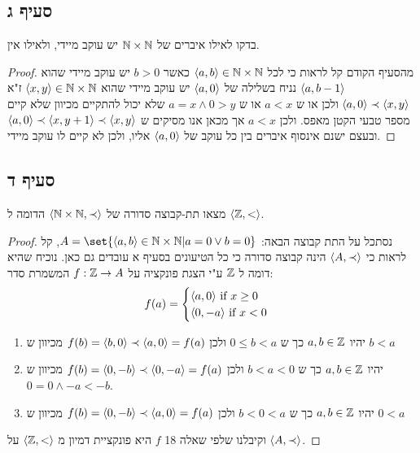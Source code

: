 \documentclass{article}
\DeclarePairedDelimiter\set\{\}
\begin{document}
	\subsection*{סעיף ג}
	בדקו לאילו איברים של $\mathbb{N} \times \mathbb{N}$ יש עוקב מיידי, ולאילו אין.
	\begin{proof}
		מהסעיף הקודם קל לראות כי לכל $\langle a,b \rangle \in \mathbb{N} \times \mathbb{N}$ כאשר $b > 0$ יש עוקב מיידי שהוא $\langle a, b-1 \rangle$
		נניח בשלילה של $\langle a,0 \rangle$ יש עוקב מיידי שהוא $\langle x,y \rangle \in \mathbb{N} \times \mathbb{N}$
		ז"א $\langle a,0 \rangle \prec \langle x,y \rangle$ ולכן או ש $a < x$ או ש $a=x \land 0 > y$ שלא יכול להתקיים מכיוון שלא קיים מספר טבעי הקטן מאפס.
		ולכן $a < x$ אך מכאן אנו מסיקים ש $\langle a,0 \rangle \prec \langle x,y+1 \rangle \prec \langle x,y \rangle$ ובעצם ישנם אינסוף איברים בין כל עוקב של $\langle a,0 \rangle$ אליו, ולכן לא קיים לו עוקב מיידי.
	\end{proof}

	\subsection*{סעיף ד}
	מצאו תת-קבוצה סדורה של $\langle \mathbb{N} \times \mathbb{N}, \prec \rangle$ הדומה ל $\langle \mathbb{Z}, < \rangle$.
	\begin{proof}
		נסתכל על התת קבוצה הבאה: $A = \set{\ang{a,b} \in \NN \times \NN | a = 0 \lor b = 0}$,
		קל לראות כי $\langle A, \prec \rangle$ הינה קבוצה סדורה כי כל הטיעונים בסעיף א עובדים גם כאן.
		נוכיח שהיא דומה ל $\mathbb{Z}$ ע"י הצגת פונקציה על $f: \mathbb{Z} \rightarrow A$ המשמרת סדר:
		\[
		f(a) = \begin{cases}
			\langle a, 0 \rangle \text{ if } x \geq 0 \\
			\langle 0, -a \rangle \text{ if } x < 0 \\
		\end{cases}
		\]
		\begin{enumerate}
			\item יהיו $a, b \in \mathbb{Z}$ כך ש $0 \leq b < a$ ולכן $f(b) = \langle b,0 \rangle \prec \langle a,0 \rangle = f(a)$ מכיוון ש $b<a$
			\item יהיו $a, b \in \mathbb{Z}$ כך ש $b < a < 0$ ולכן $f(b) = \langle 0, -b \rangle \prec \langle 0, -a \rangle = f(a)$ מכיוון ש $0=0 \land -a < -b$.
			\item יהיו $a, b \in \mathbb{Z}$ כך ש $b < 0 < a$ ולכן $f(b) = \langle 0, -b \rangle \prec \langle a,0 \rangle = f(a)$ מכיוון ש $0<a$
		\end{enumerate}
		וקיבלנו שלפי שאלה 18 $f$ היא פונקציית דמיון מ $\langle \mathbb{Z}, < \rangle$ על $\langle A, \prec \rangle$.
	\end{proof}
\end{document}
